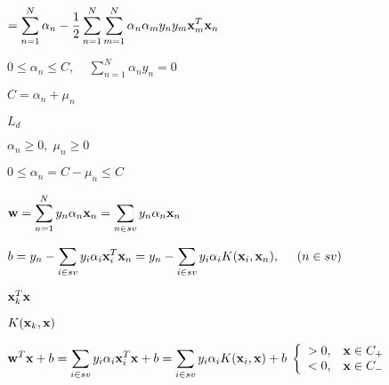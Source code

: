 \documentclass{article}
\def\lthtmlcheckvsize{\ifdim\ht\sizebox<\vsize 
  \ifdim\wd\sizebox<\hsize\expandafter\hfill\fi \expandafter\vfill
  \else\expandafter\vss\fi}%
\begin{document}
{\newpage\clearpage
{}%
$\displaystyle =\sum_{n=1}^N \alpha_n
-\frac{1}{2}\sum_{n=1}^N \sum_{m=1}^N \alpha_n\alpha_my_ny_m {\bf x}_m^T{\bf x}_n$%
\lthtmlindisplaymathZ
\lthtmlcheckvsize\clearpage}

{\newpage\clearpage
{}%
$\displaystyle 0 \le \alpha_n \le C,\;\;\;\;
\sum_{n=1}^N \alpha_n y_n=0$%
\lthtmlindisplaymathZ
\lthtmlcheckvsize\clearpage}

{\newpage\clearpage
{}%
$ C=\alpha_n+\mu_n$%
\lthtmlindisplaymathZ
\lthtmlcheckvsize\clearpage}

{\newpage\clearpage
{}%
$ L_d$%
\lthtmlindisplaymathZ
\lthtmlcheckvsize\clearpage}

{\newpage\clearpage
{}%
$ \alpha_n \ge 0,\;\mu_n \ge 0$%
\lthtmlindisplaymathZ
\lthtmlcheckvsize\clearpage}

{\newpage\clearpage
{}%
$ 0 \le \alpha_n =C-\mu_n \le C$%
\lthtmlindisplaymathZ
\lthtmlcheckvsize\clearpage}

{\newpage\clearpage
{}%
$\displaystyle {\bf w}=\sum_{n=1}^Ny_n\alpha_n{\bf x}_n
=\sum_{n\in sv} y_n\alpha_n{\bf x}_n$%
\lthtmlindisplaymathZ
\lthtmlcheckvsize\clearpage}

{\newpage\clearpage
{}%
$\displaystyle b=y_n-\sum_{i\in sv} y_i\alpha_i{\bf x}_i^T{\bf x}_n
=y_n-\sum_{i\in sv} y_i\alpha_iK({\bf x}_i,{\bf x}_n),
\;\;\;\;\;(n\in sv)$%
\lthtmlindisplaymathZ
\lthtmlcheckvsize\clearpage}

{\newpage\clearpage
{}%
$ {\bf x}_k^T{\bf x}$%
\lthtmlindisplaymathZ
\lthtmlcheckvsize\clearpage}

{\newpage\clearpage
{}%
$ K({\bf x}_k,{\bf x})$%
\lthtmlindisplaymathZ
\lthtmlcheckvsize\clearpage}

{\newpage\clearpage
{}%
$\displaystyle {\bf w}^T{\bf x}+b=\sum_{i\in sv} y_i\alpha_i {\bf x}_i^T{\bf x}+b
=\sum_{i\in sv} y_i\alpha_i K({\bf x}_i,{\bf x})+b\;
\left\{ \begin{array}{ll}>0, & {\bf x}\in C_+\\
<0, & {\bf x}\in C_-\end{array}\right.$%
\lthtmlindisplaymathZ
\lthtmlcheckvsize\clearpage}
\end{document}
